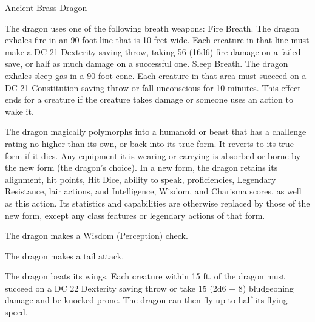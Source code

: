 \begin{monsterbox}{Ancient Brass Dragon}
\begin{monsteraction}
The dragon uses one of the following breath weapons:
Fire Breath. The dragon exhales fire in an 90-foot line that is 10 feet wide. Each creature in that line must make a DC 21 Dexterity saving throw, taking 56 (16d6) fire damage on a failed save, or half as much damage on a successful one.
Sleep Breath. The dragon exhales sleep gas in a 90-foot cone. Each creature in that area must succeed on a DC 21 Constitution saving throw or fall unconscious for 10 minutes. This effect ends for a creature if the creature takes damage or someone uses an action to wake it.
\end{monsteraction}
\begin{monsteraction}
The dragon magically polymorphs into a humanoid or beast that has a challenge rating no higher than its own, or back into its true form. It reverts to its true form if it dies. Any equipment it is wearing or carrying is absorbed or borne by the new form (the dragon's choice).
In a new form, the dragon retains its alignment, hit points, Hit Dice, ability to speak, proficiencies, Legendary Resistance, lair actions, and Intelligence, Wisdom, and Charisma scores, as well as this action. Its statistics and capabilities are otherwise replaced by those of the new form, except any class features or legendary actions of that form.
\end{monsteraction}
\begin{monsteraction}[Detect]
The dragon makes a Wisdom (Perception) check.
\end{monsteraction}
\begin{monsteraction}
The dragon makes a tail attack.
\end{monsteraction}
\begin{monsteraction}
The dragon beats its wings. Each creature within 15 ft. of the dragon must succeed on a DC 22 Dexterity saving throw or take 15 (2d6 + 8) bludgeoning damage and be knocked prone. The dragon can then fly up to half its flying speed.
\end{monsteraction}
\end{monsterbox}